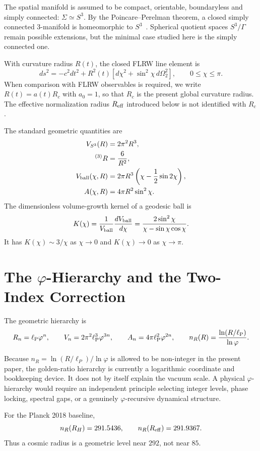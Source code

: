 \documentclass[11pt,a4paper]{article}
\newcommand{\vph}{\varphi}
\newcommand{\ellP}{\ell_{\rm P}}
\newcommand{\RH}{R_H}
\newcommand{\Reff}{R_{\rm eff}}
\begin{document}
\begin{defbox}
The spatial manifold is assumed to be compact, orientable, boundaryless and
simply connected: $\Sigma\simeq S^3$.  By the Poincare--Perelman theorem, a
closed simply connected 3-manifold is homeomorphic to $S^3$~\cite{Perelman2002,Perelman2003}.
Spherical quotient spaces $S^3/\Gamma$ remain possible extensions, but the
minimal case studied here is the simply connected one.
\end{defbox}

With curvature radius $R(t)$, the closed FLRW line element is
\begin{equation}
 ds^2=-c^2dt^2+R^2(t)\left[d\chi^2+\sin^2\chi\,d\Omega_2^2\right],
 \qquad 0\leq\chi\leq\pi .
\label{eq:metric}
\end{equation}
When comparison with FLRW observables is required, we write
$R(t)=a(t)R_c$ with $a_0=1$, so that $R_c$ is the present global curvature
radius.  The effective normalization radius $\Reff$ introduced below is not
identified with $R_c$.

The standard geometric quantities are
\begin{align}
V_{S^3}(R)&=2\pi^2R^3,\label{eq:VS3}\\
{}^{(3)}R&=\frac{6}{R^2},\label{eq:3R}\\
V_{\rm ball}(\chi,R)&=2\pi R^3\left(\chi-\frac12\sin2\chi\right),\\
A(\chi,R)&=4\pi R^2\sin^2\chi .
\end{align}
The dimensionless volume-growth kernel of a geodesic ball is
\begin{equation}
K(\chi)=\frac{1}{V_{\rm ball}}\frac{dV_{\rm ball}}{d\chi}
=\frac{2\sin^2\chi}{\chi-\sin\chi\cos\chi}.
\label{eq:kernel}
\end{equation}
It has $K(\chi)\sim3/\chi$ as $\chi\to0$ and $K(\chi)\to0$ as $\chi\to\pi$.

\section{The \texorpdfstring{$\varphi$}{phi}-Hierarchy and the Two-Index Correction}
\label{sec:hier}

The geometric hierarchy is
\begin{equation}
R_n=\ellP\vph^n,
\qquad
V_n=2\pi^2\ellP^3\vph^{3n},
\qquad
A_n=4\pi\ellP^2\vph^{2n},
\qquad
n_R(R)=\frac{\ln(R/\ellP)}{\ln\vph}.
\label{eq:hier}
\end{equation}
\begin{caveatbox}
Because $n_R=\ln(R/\ell_P)/\ln\varphi$ is allowed to be non-integer in the present
paper, the golden-ratio hierarchy is currently a logarithmic coordinate and
bookkeeping device.  It does not by itself explain the vacuum scale.  A physical
$\varphi$-hierarchy would require an independent principle selecting integer
levels, phase locking, spectral gaps, or a genuinely $\varphi$-recursive
dynamical structure.
\end{caveatbox}
For the Planck 2018 baseline,
\begin{equation}
 n_R(\RH)=291.5436,
 \qquad
 n_R(\Reff)=291.9367.
\end{equation}
Thus a cosmic radius is a geometric level near $292$, not near $85$.
\end{document}
